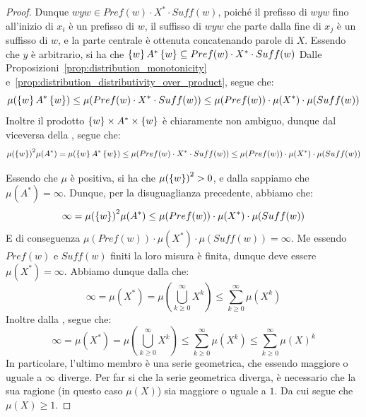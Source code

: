 \begin{proof}
  Dunque \(wyw \in Pref(w)\cdot X^* \cdot Suff(w)\), poiché il prefisso di \(wyw\) fino all'inizio di \(x_i\) è un prefisso di \(w\), il suffisso di \(wyw\) che parte dalla fine di \(x_j\) è un suffisso di \(w\), e la parte centrale è ottenuta concatenando parole di \(X\).
  Essendo che \(y\) è arbitrario, si ha che \(\set{w}A^*\set{w} \subseteq Pref(w)\cdot X^* \cdot Suff(w)\)
  Dalle Proposizioni~\ref{prop:distribution_monotonicity} e~\ref{prop:distribution_distributivity_over_product}, segue che:
  \[\mu(\set{w}A^*\set{w}) \leq \mu(Pref(w)\cdot X^* \cdot Suff(w)) \leq \mu(Pref(w))\cdot \mu(X^*)\cdot \mu(Suff(w))\]
  Inoltre il prodotto \(\set{w}\times A^* \times \set{w}\) è chiaramente non ambiguo, dunque dal viceversa della , segue che:
  \[{\mu(\set{w})}^2\mu(A^*)=\mu(\set{w}A^*\set{w}) \leq \mu(Pref(w)\cdot X^* \cdot Suff(w)) \leq \mu(Pref(w))\cdot \mu(X^*)\cdot \mu(Suff(w))\]

  Essendo che \(\mu\) è positiva, si ha che \({\mu(\set{w})}^2 > 0\), e dalla  sappiamo che \(\mu(A^*) = \infty\).
  Dunque, per la disuguaglianza precedente, abbiamo che:
  \[\infty = {\mu(\set{w})}^2\mu(A^*) \leq \mu(Pref(w))\cdot \mu(X^*)\cdot \mu(Suff(w))\]
  E di conseguenza \(\mu(Pref(w))\cdot \mu(X^*)\cdot \mu(Suff(w)) = \infty\).
  Me essendo \(Pref(w)\) e \(Suff(w)\) finiti la loro misura è finita, dunque deve essere \(\mu(X^*) = \infty\).
  Abbiamo dunque dalla  che:
  \[\infty = \mu(X^*) = \mu(\bigcup_{k \geq 0}^{\infty} X^k) \leq \sum_{k \geq 0}^{\infty} \mu(X^k)\]
  Inoltre dalla , segue che:
  \[\infty = \mu(X^*) = \mu(\bigcup_{k \geq 0}^{\infty} X^k) \leq \sum_{k \geq 0}^{\infty} \mu(X^k)\leq \sum_{k \geq 0}^{\infty} {\mu(X)}^k\]
  In particolare, l'ultimo membro è una serie geometrica, che essendo maggiore o uguale a \(\infty\) diverge.
  Per far si che la serie geometrica diverga, è necessario che la sua ragione (in questo caso \(\mu(X)\)) sia maggiore o uguale a \(1\).
  Da cui segue che \(\mu(X) \geq 1\).
\end{proof}


